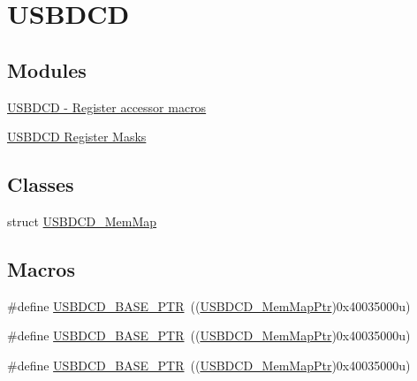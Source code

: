 \hypertarget{group___u_s_b_d_c_d___peripheral}{}\section{U\+S\+B\+D\+CD}
\label{group___u_s_b_d_c_d___peripheral}
\subsection*{Modules}
\begin{DoxyCompactItemize}
\item 
\hyperlink{group___u_s_b_d_c_d___register___accessor___macros}{U\+S\+B\+D\+C\+D -\/ Register accessor macros}
\item 
\hyperlink{group___u_s_b_d_c_d___register___masks}{U\+S\+B\+D\+C\+D Register Masks}
\end{DoxyCompactItemize}
\subsection*{Classes}
\begin{DoxyCompactItemize}
\item 
struct \hyperlink{struct_u_s_b_d_c_d___mem_map}{U\+S\+B\+D\+C\+D\+\_\+\+Mem\+Map}
\end{DoxyCompactItemize}
\subsection*{Macros}
\begin{DoxyCompactItemize}
\item 
\#define \hyperlink{group___u_s_b_d_c_d___peripheral_ga6289dc687e9b991508629237aeb61755}{U\+S\+B\+D\+C\+D\+\_\+\+B\+A\+S\+E\+\_\+\+P\+TR}~((\hyperlink{group___u_s_b_d_c_d___peripheral_gad6e68bd3ca7f14168c34ff5e824dd321}{U\+S\+B\+D\+C\+D\+\_\+\+Mem\+Map\+Ptr})0x40035000u)
\item 
\#define \hyperlink{group___u_s_b_d_c_d___peripheral_ga6289dc687e9b991508629237aeb61755}{U\+S\+B\+D\+C\+D\+\_\+\+B\+A\+S\+E\+\_\+\+P\+TR}~((\hyperlink{group___u_s_b_d_c_d___peripheral_gad6e68bd3ca7f14168c34ff5e824dd321}{U\+S\+B\+D\+C\+D\+\_\+\+Mem\+Map\+Ptr})0x40035000u)
\item 
\#define \hyperlink{group___u_s_b_d_c_d___peripheral_ga6289dc687e9b991508629237aeb61755}{U\+S\+B\+D\+C\+D\+\_\+\+B\+A\+S\+E\+\_\+\+P\+TR}~((\hyperlink{group___u_s_b_d_c_d___peripheral_gad6e68bd3ca7f14168c34ff5e824dd321}{U\+S\+B\+D\+C\+D\+\_\+\+Mem\+Map\+Ptr})0x40035000u)
\end{DoxyCompactItemize}
